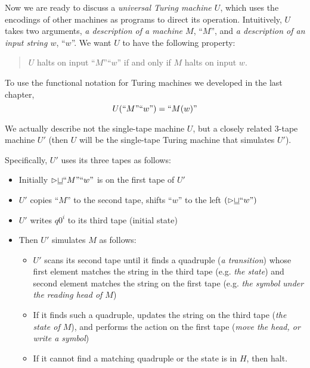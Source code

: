 Now we are ready to discuss a \textit{universal Turing machine $U$}, which uses the encodings of other machines as programs to direct its operation. Intuitively, $U$ takes two arguments, \textit{a description of a machine $M$}, ``$M$'', and \textit{a description of an input string $w$}, ``$w$''. We want $U$ to have the following property:
\begin{quote}
  $U$ halts on input ``$M$''``$w$'' if and only if $M$ halts on input $w$.
\end{quote}
To use the functional notation for Turing machines we developed in the last chapter,
\begin{equation*}
  U(\textnormal{``$M$''}\textnormal{``$w$''}) = \textnormal{``$M(w)$''}
\end{equation*}

We actually describe not the single-tape machine $U$, but a closely related 3-tape machine $U'$ (then $U$ will be the single-tape Turing machine that simulates $U'$). 

\vspace*{\fill}
\columnbreak

Specifically, $U'$ uses its three tapes as follows:
\begin{itemize}
  \item Initially ${\vartriangleright}{\underline{\sqcup}}\textnormal{``}M\textnormal{''``}w\textnormal{''}$ is on the first tape of $U'$  
  \item $U'$ copies ``$M$'' to the second tape, shifts ``$w$'' to the left $({\vartriangleright}{\underline{\sqcup}}\textnormal{``}w\textnormal{''})$
  \item $U'$ writes $q0^i$ to its third tape (initial state)
  \item Then $U'$ simulates $M$ as follows:
    \begin{itemize}
      \item $U'$ scans its second tape until it finds a quadruple (\textit{a transition}) whose first element matches the string in the third tape (e.g. \textit{the state}) and second element matches the string on the first tape (e.g. \textit{the symbol under the reading head of $M$})
      \item If it finds such a quadruple, updates the string on the third tape (\textit{the state of $M$}), and performs the action on the first tape (\textit{move the head, or write a symbol})
      \item If it cannot find a matching quadruple or the state is in $H$, then halt.
    \end{itemize}
\end{itemize}
